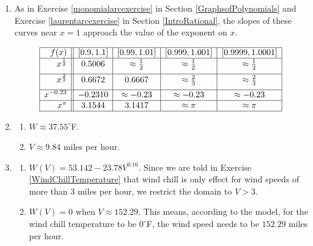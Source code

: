 \begin{enumerate}
\setcounter{enumi}{\value{HW}}

\item As in  Exercise \ref{monomialarcexercise} in Section \ref{GraphsofPolynomials} and Exercise \ref{laurentarcexercise} in Section \ref{IntroRational}, the slopes of these curves near $x = 1$ approach the value of the exponent on $x$.

\[ \begin{array}{|r||c|c|c|c|}  \hline

 f(x) &  [0.9, 1.1] & [0.99, 1.01] &[0.999, 1.001] & [0.9999, 1.0001]  \\ \hline
 x^{\frac{1}{2}} & 0.5006 & \approx \frac{1}{2} & \approx \frac{1}{2} & \approx \frac{1}{2} \\ [5pt] \hline
 x^{\frac{2}{3}} & 0.6672 & 0.6667 & \approx \frac{2}{3} & \approx \frac{2}{3}  \\ [5pt] \hline
 x^{-0.23} & -0.2310 & \approx -0.23 &\approx -0.23 &  \approx -0.23  \\  \hline
 x^{\pi}  &3.1544 & 3.1417 & \approx \pi & \approx \pi   \\  \hline

\end{array} \]

\item

\begin{enumerate}

\item  $W \approx 37.55^{\circ}$F.

\item  $V \approx 9.84$ miles per hour.

\end{enumerate}

\item 

\begin{enumerate}

\item $W(V) = 53.142 - 23.78 V^{0.16}$.  Since we are told in Exercise \ref{WindChillTemperature} that wind chill is only effect for wind speeds of more than 3 miles per hour, we restrict the domain to $V > 3$.

\item $W(V)=0$ when $V \approx 152.29$.  This means, according to the model, for the wind chill temperature to be $0^{\circ}$F, the wind speed needs to be $152.29$ miles per hour.


\end{enumerate}
\end{enumerate}

